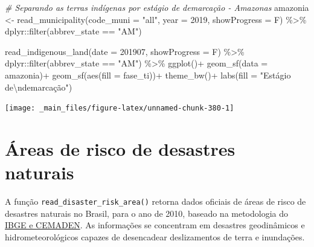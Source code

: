 \documentclass[
  brazilian,
]{book}
\newenvironment{Shaded}{\begin{snugshade}}{\end{snugshade}}
\newcommand{\AttributeTok}[1]{\textcolor[rgb]{0.77,0.63,0.00}{#1}}
\newcommand{\CommentTok}[1]{\textcolor[rgb]{0.56,0.35,0.01}{\textit{#1}}}
\newcommand{\DecValTok}[1]{\textcolor[rgb]{0.00,0.00,0.81}{#1}}
\newcommand{\FunctionTok}[1]{\textcolor[rgb]{0.00,0.00,0.00}{#1}}
\newcommand{\NormalTok}[1]{#1}
\newcommand{\OtherTok}[1]{\textcolor[rgb]{0.56,0.35,0.01}{#1}}
\newcommand{\SpecialCharTok}[1]{\textcolor[rgb]{0.00,0.00,0.00}{#1}}
\newcommand{\StringTok}[1]{\textcolor[rgb]{0.31,0.60,0.02}{#1}}
\begin{document}
\begin{Shaded}
\begin{Highlighting}[]
\CommentTok{\# Separando as terras indígenas por estágio de demarcação {-} Amazonas}
\NormalTok{amazonia }\OtherTok{\textless{}{-}} \FunctionTok{read\_municipality}\NormalTok{(}\AttributeTok{code\_muni =} \StringTok{"all"}\NormalTok{,}
                              \AttributeTok{year =} \DecValTok{2019}\NormalTok{,}
                              \AttributeTok{showProgress =}\NormalTok{ F) }\SpecialCharTok{\%\textgreater{}\%} 
\NormalTok{  dplyr}\SpecialCharTok{::}\FunctionTok{filter}\NormalTok{(abbrev\_state }\SpecialCharTok{==} \StringTok{"AM"}\NormalTok{)}

\FunctionTok{read\_indigenous\_land}\NormalTok{(}\AttributeTok{date =} \DecValTok{201907}\NormalTok{,}
                     \AttributeTok{showProgress =}\NormalTok{ F) }\SpecialCharTok{\%\textgreater{}\%} 
\NormalTok{  dplyr}\SpecialCharTok{::}\FunctionTok{filter}\NormalTok{(abbrev\_state }\SpecialCharTok{==} \StringTok{"AM"}\NormalTok{) }\SpecialCharTok{\%\textgreater{}\%} 
  \FunctionTok{ggplot}\NormalTok{()}\SpecialCharTok{+}
  \FunctionTok{geom\_sf}\NormalTok{(}\AttributeTok{data =}\NormalTok{ amazonia)}\SpecialCharTok{+}
  \FunctionTok{geom\_sf}\NormalTok{(}\FunctionTok{aes}\NormalTok{(}\AttributeTok{fill =}\NormalTok{ fase\_ti))}\SpecialCharTok{+}
  \FunctionTok{theme\_bw}\NormalTok{()}\SpecialCharTok{+}
  \FunctionTok{labs}\NormalTok{(}\AttributeTok{fill =} \StringTok{"Estágio de}\SpecialCharTok{\textbackslash{}n}\StringTok{demarcação"}\NormalTok{)}
\end{Highlighting}
\end{Shaded}

\begin{center}\texttt{[image: \_main\_files/figure-latex/unnamed-chunk-380-1]} \end{center}

\hypertarget{uxe1reas-de-risco-de-desastres-naturais}{%
\section{Áreas de risco de desastres naturais}\label{uxe1reas-de-risco-de-desastres-naturais}}

A função \texttt{read\_disaster\_risk\_area()} retorna dados oficiais de áreas de risco de desastres naturais no Brasil, para o ano de 2010, baseado na metodologia do \href{https://www.ibge.gov.br/geociencias/organizacao-do-territorio/tipologias-do-territorio/21538-populacao-em-areas-de-risco-no-brasil.html}{IBGE e CEMADEN}. As informações se concentram em desastres geodinâmicos e hidrometeorológicos capazes de desencadear deslizamentos de terra e inundações.
\end{document}
